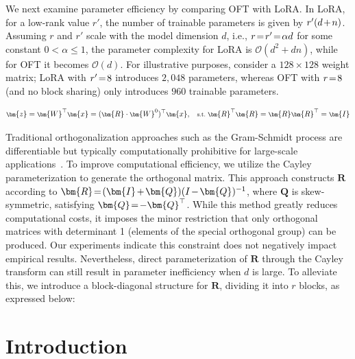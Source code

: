 We next examine parameter efficiency by comparing OFT with LoRA. In LoRA, for a low-rank value $r'$, the number of trainable parameters is given by $\thickmuskip=2mu \medmuskip=2mu r'(d+n)$. Assuming $r$ and $r'$ scale with the model dimension $d$, i.e., $\thickmuskip=2mu \medmuskip=2mu r=r'=\alpha d$ for some constant $0<\alpha\leq1$, the parameter complexity for LoRA is $\mathcal{O}(d^2+dn)$, while for OFT it becomes $\mathcal{O}(d)$. For illustrative purposes, consider a $128\times 128$ weight matrix; LoRA with $\thickmuskip=2mu \medmuskip=2mu r'=8$ introduces $2,048$ parameters, whereas OFT with $\thickmuskip=2mu \medmuskip=2mu r=8$ (and no block sharing) only introduces $960$ trainable parameters.

\begin{equation}\label{eq:oft_general}
    \footnotesize
    \bm{z}=\bm{W}^\top\bm{x}=(\bm{R}\cdot\bm{W}^0)^\top\bm{x},~~~\text{s.t.}~\bm{R}^\top\bm{R}=\bm{R}\bm{R}^\top=\bm{I}
\end{equation}

Traditional orthogonalization approaches such as the Gram-Schmidt process are differentiable but typically computationally prohibitive for large-scale applications~\cite{liu2021orthogonal}. To improve computational efficiency, we utilize the Cayley parameterization to generate the orthogonal matrix. This approach constructs $\bm{R}$ according to $\thickmuskip=2mu \medmuskip=2mu \bm{R}=(\bm{I}+\bm{Q})(I-\bm{Q})^{-1}$, where $\bm{Q}$ is skew-symmetric, satisfying $\thickmuskip=2mu \medmuskip=2mu \bm{Q}=-\bm{Q}^\top$. While this method greatly reduces computational costs, it imposes the minor restriction that only orthogonal matrices with determinant 1 (elements of the special orthogonal group) can be produced. Our experiments indicate this constraint does not negatively impact empirical results. Nevertheless, direct parameterization of $\bm{R}$ through the Cayley transform can still result in parameter inefficiency when $d$ is large. To alleviate this, we introduce a block-diagonal structure for $\bm{R}$, dividing it into $r$ blocks, as expressed below:

\section{Introduction}

